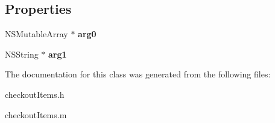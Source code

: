 \subsection*{Properties}
\begin{DoxyCompactItemize}
\item 
\hypertarget{interfacecheckout_items_a43853159c2ee2d3c79ffca1ad0e392a8}{}N\+S\+Mutable\+Array $\ast$ {\bfseries arg0}\label{interfacecheckout_items_a43853159c2ee2d3c79ffca1ad0e392a8}

\item 
\hypertarget{interfacecheckout_items_ae63e75b9f9638afd50686d907381a141}{}N\+S\+String $\ast$ {\bfseries arg1}\label{interfacecheckout_items_ae63e75b9f9638afd50686d907381a141}

\end{DoxyCompactItemize}


The documentation for this class was generated from the following files\+:\begin{DoxyCompactItemize}
\item 
checkout\+Items.\+h\item 
checkout\+Items.\+m\end{DoxyCompactItemize}
